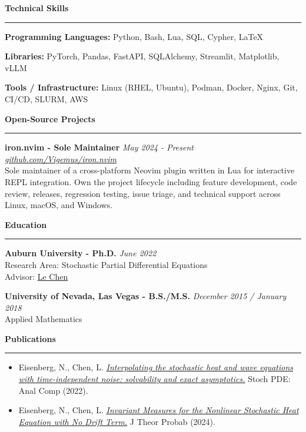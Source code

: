\documentclass[11pt]{article}
\begin{document}
\textbf{\Large Technical Skills} \vspace{.2em} \hrule

\textbf{Programming Languages:}
Python, Bash, Lua, SQL, Cypher, \LaTeX

\vspace{-.5em}

\textbf{Libraries:}
PyTorch, Pandas, FastAPI, SQLAlchemy, Streamlit, Matplotlib, vLLM

\vspace{-.5em}

\textbf{Tools / Infrastructure:}
Linux (RHEL, Ubuntu), Podman, Docker, Nginx, Git, CI/CD, SLURM, AWS

\textbf{\Large Open-Source Projects} \vspace{.2em} \hrule
\textbf{\large iron.nvim - Sole Maintainer}
\hfill \textit{May 2024 - Present}\\
\href{https://github.com/Vigemus/iron.nvim}
     {\textit{github.com/Vigemus/iron.nvim}}\\
Sole maintainer of a cross-platform Neovim plugin written in Lua for
interactive REPL integration. Own the project lifecycle including feature
development, code review, releases, regression testing, issue triage, and
technical support across Linux, macOS, and Windows.

\textbf{\Large Education} \vspace{.2em} \hrule

\textbf{Auburn University - Ph.D.}
\hfill \textit{June 2022}\\
Research Area: Stochastic Partial Differential Equations\\
Advisor: \href{http://webhome.auburn.edu/~lzc0090/}{Le Chen}

\textbf{University of Nevada, Las Vegas - B.S./M.S.}
\hfill \textit{December 2015 / January 2018}\\
Applied Mathematics

\textbf{\Large Publications} \vspace{.2em} \hrule

\begin{itemize}[leftmargin=*,nosep]

    \item[1:]
    Eisenberg, N., Chen, L.
    \href{https://doi.org/10.1007/s40072-022-00258-6}
    {\textit{Interpolating the stochastic heat and wave equations with
    time-independent noise: solvability and exact asymptotics.}}
    Stoch PDE: Anal Comp (2022).

    \item[2:]
    Eisenberg, N., Chen, L.
    \href{https://doi.org/10.1007/s10959-023-01302-4}
    {\textit{Invariant Measures for the Nonlinear Stochastic Heat Equation
    with No Drift Term.}}
    J Theor Probab (2024).

\end{itemize}
\end{document}
